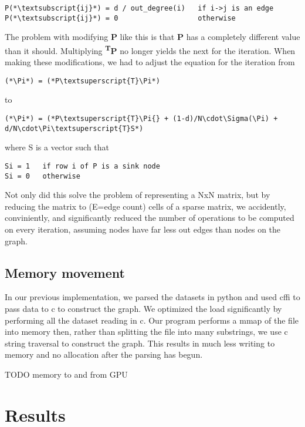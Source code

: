 \documentclass[draft]{report}
\begin{document}
\begin{lstlisting}
P(*\textsubscript{ij}*) = d / out_degree(i)   if i->j is an edge
P(*\textsubscript{ij}*) = 0                   otherwise
\end{lstlisting}

The problem with modifying \textbf{P} like this is that \textbf{P} has a completely different value than it should. Multiplying \textbf{\Pi\textsuperscript{T}P} no longer yields the next \Pi{} for the iteration. When making these modifications, we had to adjust the equation for the iteration from

\begin{lstlisting}
(*\Pi*) = (*P\textsuperscript{T}\Pi*)
\end{lstlisting}

to

\begin{lstlisting}
(*\Pi*) = (*P\textsuperscript{T}\Pi{} + (1-d)/N\cdot\Sigma(\Pi) + d/N\cdot\Pi\textsuperscript{T}S*)
\end{lstlisting}

where S is a vector such that

\begin{lstlisting}
Si = 1   if row i of P is a sink node
Si = 0   otherwise
\end{lstlisting}

Not only did this solve the problem of representing a NxN matrix, but by reducing the matrix to (E=edge count) cells of a sparse matrix, we accidently, conviniently, and significantly reduced the number of operations to be computed on every iteration, assuming nodes have far less out edges than nodes on the graph.

\subsection{Memory movement}
In our previous implementation, we parsed the datasets in python and used cffi to pass data to c to construct the graph. We optimized the load significantly by performing all the dataset reading in c. Our program performs a mmap of the file into memory then, rather than splitting the file into many substrings, we use c string traversal to construct the graph. This results in much less writing to memory and no allocation after the parsing has begun.

TODO memory to and from GPU

\section{Results}
\end{document}
